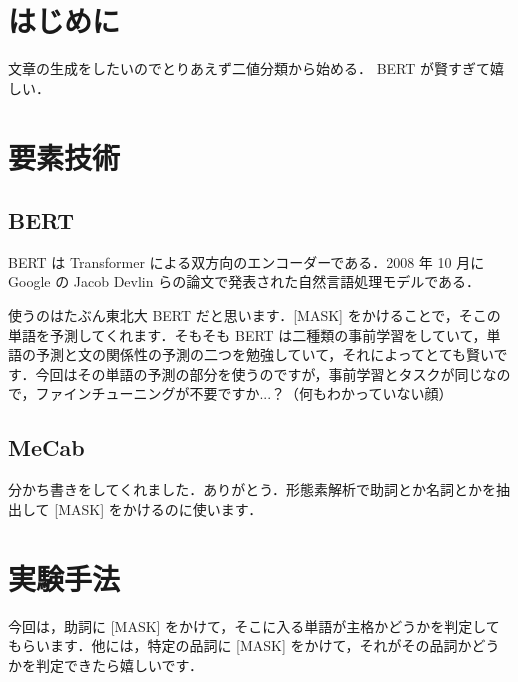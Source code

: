 \documentclass[twocolumn]{jarticle}
\begin{document}

\section{はじめに}
文章の生成をしたいのでとりあえず二値分類から始める．
BERT が賢すぎて嬉しい．

\section{要素技術}
  \subsection{BERT}
  BERT\cite{DBLP} は Transformer による双方向のエンコーダーである．2008 年 10 月に Google の Jacob Devlin らの論文で発表された自然言語処理モデルである．
  \par
  使うのはたぶん東北大 BERT だと思います．[MASK] をかけることで，そこの単語を予測してくれます．そもそも BERT は二種類の事前学習をしていて，単語の予測と文の関係性の予測の二つを勉強していて，それによってとても賢いです．今回はその単語の予測の部分を使うのですが，事前学習とタスクが同じなので，ファインチューニングが不要ですか...？（何もわかっていない顔）
  \subsection{MeCab}
  分かち書きをしてくれました．ありがとう．形態素解析で助詞とか名詞とかを抽出して [MASK] をかけるのに使います．

\section{実験手法}
今回は，助詞に [MASK] をかけて，そこに入る単語が主格かどうかを判定してもらいます．他には，特定の品詞に [MASK] をかけて，それがその品詞かどうかを判定できたら嬉しいです．
\end{document}
